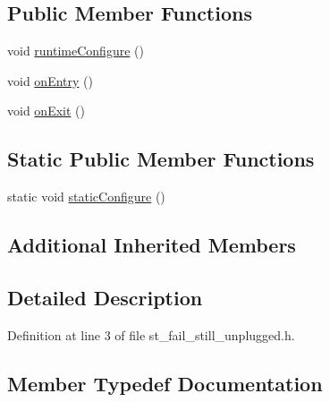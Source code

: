 \subsection*{Public Member Functions}
\begin{DoxyCompactItemize}
\item 
void \hyperlink{structsm__pr2__plugs_1_1StFailStillUnplugged_af8704d60b24ec65be825b5dc416632d1}{runtime\+Configure} ()
\item 
void \hyperlink{structsm__pr2__plugs_1_1StFailStillUnplugged_a08767f49952e0dfc3c8b3449ef06beb9}{on\+Entry} ()
\item 
void \hyperlink{structsm__pr2__plugs_1_1StFailStillUnplugged_afb1c26fa363605535ab36ebf13151718}{on\+Exit} ()
\end{DoxyCompactItemize}
\subsection*{Static Public Member Functions}
\begin{DoxyCompactItemize}
\item 
static void \hyperlink{structsm__pr2__plugs_1_1StFailStillUnplugged_a42820633846d0c87f9793a11b484d292}{static\+Configure} ()
\end{DoxyCompactItemize}
\subsection*{Additional Inherited Members}


\subsection{Detailed Description}


Definition at line 3 of file st\+\_\+fail\+\_\+still\+\_\+unplugged.\+h.



\subsection{Member Typedef Documentation}
\mbox{\label{structsm__pr2__plugs_1_1StFailStillUnplugged_a58dc75afc3040293cac801248a1c999c}} 
